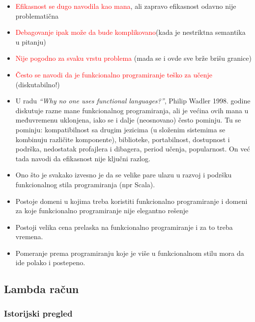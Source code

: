 \documentclass[../main.tex]{subfiles}
\begin{document}
\begin{itemize}
	   \item \textcolor{red}{Efikasnost se dugo navodila kao mana}, ali zapravo efikasnost odavno nije problematična
	   \item \textcolor{red}{Debagovanje ipak može da bude komplikovano}(kada je nestriktna semantika u pitanju)
	   \item \textcolor{red}{Nije pogodno za svaku vrstu problema} (mada se i ovde sve brže brišu granice)
	   \item \textcolor{red}{Često se navodi da je funkcionalno programiranje teško za učenje} (diskutabilno!)
	   \item U radu {\it ``Why no one uses functional languages?''}, Philip Wadler 1998. godine diskutuje razne mane funkcionalnog programiranja, ali je većina ovih mana u međuvremenu uklonjena, iako se i dalje (neosnovano) često pominju. Tu se pominju: kompatibilnost sa drugim jezicima (u složenim sistemima se kombinuju različite komponente), biblioteke, portabilnost, dostupnost i podrška, nedostatak profajlera i dibagera, period učenja, popularnost. On već tada navodi da efikasnost nije ključni razlog.
	   \item Ono što je svakako izvesno je da se velike pare ulazu u razvoj i podršku funkcionalnog stila programiranja (npr Scala).
	   \item Postoje domeni u kojima treba koristiti funkcionalno programiranje i domeni za koje funkcionalno programiranje nije elegantno rešenje
	   \item Postoji velika cena prelaska na funkcionalno programiranje i za to treba vremena.
	   \item Pomeranje prema programiranju koje je više u funkcionalnom stilu mora da ide polako i postepeno.
	   
	   \end{itemize}
	   
	   \subsection{Lambda račun}							%
	   
	   \subsubsection{Istorijski pregled}						%
	   
\end{document}
